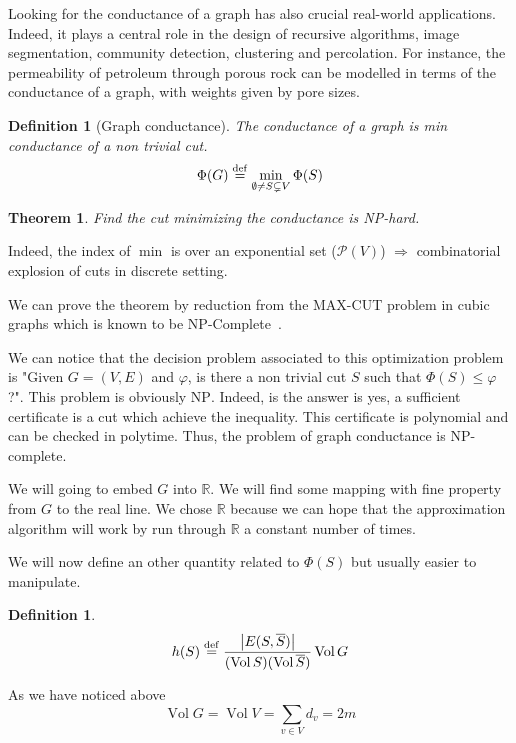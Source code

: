 \documentclass[12pt]{article}
\newtheorem{theorem}[lemma]{Theorem}
\newtheorem{definition}[lemma]{Definition}
\newcommand{\defeq}{\stackrel{{\rm def}}{=}}
\newcommand{\RR}{\mathbb{R}}
\newcommand{\Ra}{\Rightarrow}
\newcommand{\card}[1]{\left\lvert#1\right\rvert}
\newcommand{\NP}{\textsc{NP}}
\DeclareMathOperator{\vol}{Vol}
\begin{document}
Looking for the conductance of a graph has also crucial real-world applications. Indeed, it plays a central role in the design of recursive algorithms, image segmentation, community detection, clustering and percolation. For instance, the permeability of petroleum through porous rock can be modelled in terms of the conductance of a graph, with weights given by pore sizes.

\begin{definition}[Graph conductance]
    The conductance of a graph is min conductance of a non trivial cut.
    \[
        \Phi(G) \defeq \min\limits_{\emptyset \neq S \subsetneq V} \Phi(S)
    \]
\end{definition}

\begin{theorem}
    Find the cut minimizing the conductance is \NP-hard.
\end{theorem}

Indeed, the index of $\min$ is over an exponential set ($\mathcal{P}(V)$) $\Ra$ combinatorial explosion of cuts in discrete setting.

We can prove the theorem by reduction from the MAX-CUT problem in cubic graphs which is known to be \NP-Complete~\cite{yannakakis1978node}.

We can notice that the decision problem associated to this optimization problem is "Given $G=(V,E)$ and $\varphi$, is there a non trivial cut $S$ such that $\Phi(S) \leqslant \varphi$?". This problem is obviously \NP. Indeed, is the answer is yes, a sufficient certificate is a cut which achieve the inequality. This certificate is polynomial and can be checked in polytime. Thus, the problem of graph conductance is \NP-complete.

\bigskip

We will going to embed $G$ into $\RR$. We will find some mapping with fine property from $G$ to the real line. We chose $\RR$ because we can hope that the approximation algorithm will work by run through $\RR$ a constant number of times.

We will now define an other quantity related to $\Phi(S)$ but usually easier to manipulate.

\begin{definition}
    \[
        h(S) \defeq \frac{\card{E(S,\overline{S})}}{(\vol S)(\vol \overline{S})} \vol G
    \]
\end{definition}

As we have noticed above
\[
    \vol G = \vol V = \sum\limits_{v\in V} d_v = 2m
\]
\end{document}

